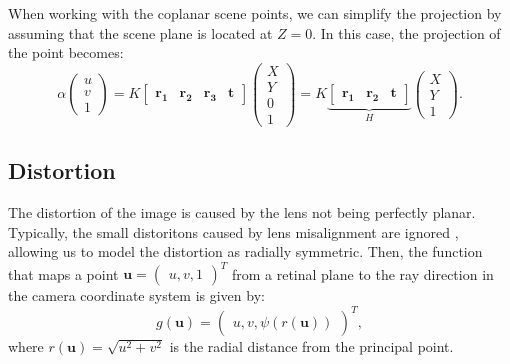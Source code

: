 When working with the coplanar scene points, we can simplify the projection
by assuming that the scene plane is located at \(Z = 0\). In this case, the
projection of the point becomes:
\begin{equation}
	\alpha \begin{pmatrix}
		u \\ v \\ 1
	\end{pmatrix} = K \begin{bmatrix}
		\mathbf{r_1} & \mathbf{r_2} & \mathbf{r_3} & \mathbf{t}
	\end{bmatrix} \begin{pmatrix}
		X \\ Y \\ 0 \\ 1
	\end{pmatrix} = K \underbrace{\begin{bmatrix}
			\mathbf{r_1} & \mathbf{r_2} & \mathbf{t}
		\end{bmatrix}}_{H} \begin{pmatrix}
		X \\ Y \\ 1
	\end{pmatrix}.
\end{equation}

\subsection{Distortion}\label{sub:distortion}

The distortion of the image is caused by the lens not being perfectly planar.
Typically, the small distoritons caused by lens misalignment are ignored
, allowing us to model the distortion as radially symmetric.
Then, the function that maps a point \(\mathbf{u} = \begin{pmatrix}
	u, v, 1
\end{pmatrix}^{T}\) from a retinal plane  to the
ray direction in the camera coordinate system is given by:
\begin{equation}
	g(\mathbf{u}) = \begin{pmatrix}
		u, v, \psi(r(\mathbf{u}))
	\end{pmatrix}^{T},
\end{equation}
where \(r(\mathbf{u}) = \sqrt{u^2 + v^2}\) is the radial distance from the
principal point.

